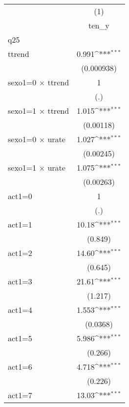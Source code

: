 {
\def\sym#1{\ifmmode^{#1}\else\(^{#1}\)\fi}
\begin{tabular}{l*{1}{c}}
\hline\hline
                    &\multicolumn{1}{c}{(1)}\\
                    &\multicolumn{1}{c}{ten\_y}\\
\hline
q25                 &                     \\
ttrend              &       0.991\sym{***}\\
                    &  (0.000938)         \\
[1em]
sexo1=0 $\times$ ttrend&           1         \\
                    &         (.)         \\
[1em]
sexo1=1 $\times$ ttrend&       1.015\sym{***}\\
                    &   (0.00118)         \\
[1em]
sexo1=0 $\times$ urate&       1.027\sym{***}\\
                    &   (0.00245)         \\
[1em]
sexo1=1 $\times$ urate&       1.075\sym{***}\\
                    &   (0.00263)         \\
[1em]
act1=0              &           1         \\
                    &         (.)         \\
[1em]
act1=1              &       10.18\sym{***}\\
                    &     (0.849)         \\
[1em]
act1=2              &       14.60\sym{***}\\
                    &     (0.645)         \\
[1em]
act1=3              &       21.61\sym{***}\\
                    &     (1.217)         \\
[1em]
act1=4              &       1.553\sym{***}\\
                    &    (0.0368)         \\
[1em]
act1=5              &       5.986\sym{***}\\
                    &     (0.266)         \\
[1em]
act1=6              &       4.718\sym{***}\\
                    &     (0.226)         \\
[1em]
act1=7              &       13.03\sym{***}\\

\end{tabular}}
